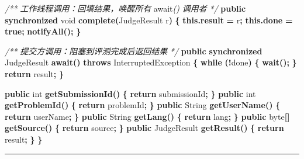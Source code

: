 \documentclass[
  11pt,
]{ctexart}
\newenvironment{Shaded}{\begin{snugshade}}{\end{snugshade}}
\newcommand{\BuiltInTok}[1]{#1}
\newcommand{\CommentTok}[1]{\textcolor[rgb]{0.56,0.35,0.01}{\textit{#1}}}
\newcommand{\ControlFlowTok}[1]{\textcolor[rgb]{0.13,0.29,0.53}{\textbf{#1}}}
\newcommand{\DataTypeTok}[1]{\textcolor[rgb]{0.13,0.29,0.53}{#1}}
\newcommand{\FunctionTok}[1]{\textcolor[rgb]{0.13,0.29,0.53}{\textbf{#1}}}
\newcommand{\KeywordTok}[1]{\textcolor[rgb]{0.13,0.29,0.53}{\textbf{#1}}}
\newcommand{\NormalTok}[1]{#1}
\newcommand{\OperatorTok}[1]{\textcolor[rgb]{0.81,0.36,0.00}{\textbf{#1}}}
\begin{document}
\begin{Shaded}
\begin{Highlighting}[]
    \CommentTok{/**} \CommentTok{工作线程调用：回填结果，唤醒所有}\NormalTok{ await}\CommentTok{()} \CommentTok{调用者} \CommentTok{*/}
    \KeywordTok{public} \KeywordTok{synchronized} \DataTypeTok{void} \FunctionTok{complete}\OperatorTok{(}\NormalTok{JudgeResult r}\OperatorTok{)} \OperatorTok{\{}
        \KeywordTok{this}\OperatorTok{.}\FunctionTok{result} \OperatorTok{=}\NormalTok{ r}\OperatorTok{;}
        \KeywordTok{this}\OperatorTok{.}\FunctionTok{done}   \OperatorTok{=} \KeywordTok{true}\OperatorTok{;}
        \FunctionTok{notifyAll}\OperatorTok{();}
    \OperatorTok{\}}

    \CommentTok{/**} \CommentTok{提交方调用：阻塞到评测完成后返回结果} \CommentTok{*/}
    \KeywordTok{public} \KeywordTok{synchronized}\NormalTok{ JudgeResult }\FunctionTok{await}\OperatorTok{()} \KeywordTok{throws} \BuiltInTok{InterruptedException} \OperatorTok{\{}
        \ControlFlowTok{while} \OperatorTok{(!}\NormalTok{done}\OperatorTok{)} \OperatorTok{\{}
            \FunctionTok{wait}\OperatorTok{();}
        \OperatorTok{\}}
        \ControlFlowTok{return}\NormalTok{ result}\OperatorTok{;}
    \OperatorTok{\}}

    \KeywordTok{public} \DataTypeTok{int} \FunctionTok{getSubmissionId}\OperatorTok{()} \OperatorTok{\{} \ControlFlowTok{return}\NormalTok{ submissionId}\OperatorTok{;} \OperatorTok{\}}
    \KeywordTok{public} \DataTypeTok{int} \FunctionTok{getProblemId}\OperatorTok{()}    \OperatorTok{\{} \ControlFlowTok{return}\NormalTok{ problemId}\OperatorTok{;} \OperatorTok{\}}
    \KeywordTok{public} \BuiltInTok{String} \FunctionTok{getUserName}\OperatorTok{()}  \OperatorTok{\{} \ControlFlowTok{return}\NormalTok{ userName}\OperatorTok{;} \OperatorTok{\}}
    \KeywordTok{public} \BuiltInTok{String} \FunctionTok{getLang}\OperatorTok{()}      \OperatorTok{\{} \ControlFlowTok{return}\NormalTok{ lang}\OperatorTok{;} \OperatorTok{\}}
    \KeywordTok{public} \DataTypeTok{byte}\OperatorTok{[]} \FunctionTok{getSource}\OperatorTok{()}    \OperatorTok{\{} \ControlFlowTok{return}\NormalTok{ source}\OperatorTok{;} \OperatorTok{\}}
    \KeywordTok{public}\NormalTok{ JudgeResult }\FunctionTok{getResult}\OperatorTok{()} \OperatorTok{\{} \ControlFlowTok{return}\NormalTok{ result}\OperatorTok{;} \OperatorTok{\}}
\OperatorTok{\}}
\end{Highlighting}
\end{Shaded}

\begin{center}\rule{0.5\linewidth}{0.5pt}\end{center}
\end{document}
